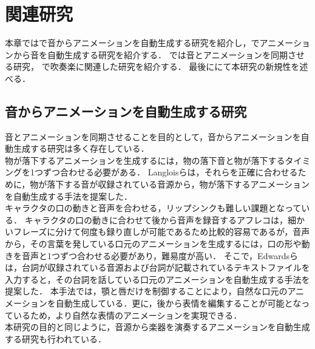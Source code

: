 \chapter{関連研究}
\label{chap:previousworks}
本章ではで音からアニメーションを自動生成する研究を紹介し，でアニメーションから音を自動生成する研究を紹介する．
では音とアニメーションを同期させる研究，
で吹奏楽に関連した研究を紹介する．
最後ににて本研究の新規性を述べる．

\section{音からアニメーションを自動生成する研究}\label{sec:generate_animation}
音とアニメーションを同期させることを目的として，音からアニメーションを自動生成する研究は多く存在している．\\
\indent
物が落下するアニメーションを生成するには，物の落下音と物が落下するタイミングを1つずつ合わせる必要がある．
Langloisら\cite{IFA}は，それらを正確に合わせるために，物が落下する音が収録されている音源から，物が落下するアニメーションを自動生成する手法を提案した．\\
%
\indent
キャラクタの口の動きと音声を合わせる，リップシンクも難しい課題となっている．
キャラクタの口の動きに合わせて後から音声を録音するアフレコは，細かいフレーズに分けて何度も録り直しが可能であるため比較的容易であるが，音声から，その言葉を発している口元のアニメーションを生成するには，口の形や動きを音声と1つずつ合わせる必要があり，難易度が高い．
そこで，Edwardsら\cite{JALI}は，台詞が収録されている音源および台詞が記載されているテキストファイルを入力すると，その台詞を話している口元のアニメーションを自動生成する手法を提案した．
本手法では，顎と唇だけを制御することにより，自然な口元のアニメーションを自動生成している．更に，後から表情を編集することが可能となっているため，より自然な表情のアニメーションを実現できる．\\
%
\indent
本研究の目的と同じように，音源から楽器を演奏するアニメーションを自動生成する研究も行われている．
